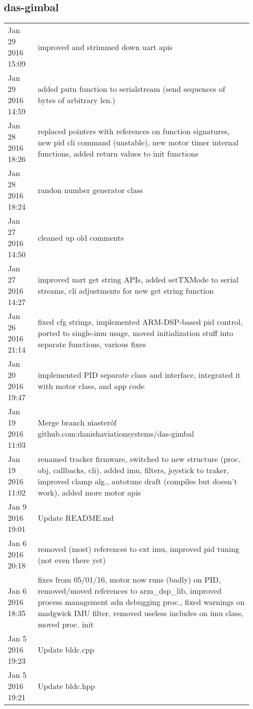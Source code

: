\subsection{das-gimbal}

\begin{tabular}{ l || p{11cm} }
	\hline			
	Jan 29 2016 15:09	& improved and strimmed down uart apis	\\
	Jan 29 2016 14:59	& added putn function to serialstream (send sequences of bytes of arbitrary len.)	\\
	Jan 28 2016 18:26	& replaced pointers with references on function signatures, new pid cli command (unstable), new motor timer internal functions, added return values to init functions	\\
	Jan 28 2016 18:24	& randon number generator class	\\
	Jan 27 2016 14:50	& cleaned up old comments	\\
	Jan 27 2016 14:27	& improved uart get string APIs, added setTXMode to serial streams, cli adjustments for new get string function	\\
	Jan 26 2016 21:14	& fixed cfg strings, implemented ARM-DSP-based pid control, ported to single-imu usage, moved initialization stuff into separate functions, various fixes	\\
	Jan 20 2016 19:47	& implemented PID separate class and interface, integrated it with motor class, and app code	\\
	Jan 19 2016 11:03	& Merge branch \'master\' of github.com:danishaviationsystems/das-gimbal	\\
	Jan 19 2016 11:02	& renamed tracker firmware, switched to new structure (proc, obj, callbacks, cli), added imu, filters, joystick to traker, improved clamp alg., autotune draft (compiles but doesn't work), added more motor apis	\\
	Jan 9 2016 19:01	& Update README.md	\\
	Jan 6 2016 20:18	& removed (most) references to ext imu, improved pid tuning (not even there yet)	\\
	Jan 6 2016 18:35	& fixes from 05/01/16, motor now runs (badly) on PID, removed/moved references to arm{\_}dsp{\_}lib, improved process management adn debugging proc., fixed warnings on madgwick IMU filter, removed useless includes on imu class, moved proc. init	\\
	Jan 5 2016 19:23	& Update bldc.cpp	\\
	Jan 5 2016 19:21	& Update bldc.hpp	\\

\end{tabular}
